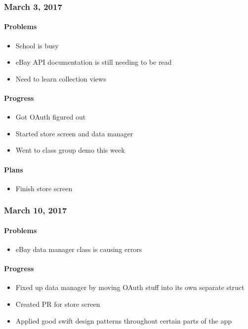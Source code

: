 \subsubsection{March 3, 2017}\label{section}
\paragraph{Problems}\label{problems}
\begin{itemize}
\tightlist
\item
  School is busy
\item
  eBay API documentation is still needing to be read
\item
  Need to learn collection views
\end{itemize}
\paragraph{Progress}\label{progress}
\begin{itemize}
\tightlist
\item
  Got OAuth figured out
\item
  Started store screen and data manager
\item
  Went to class group demo this week
\end{itemize}
\paragraph{Plans}\label{plans}
\begin{itemize}
\tightlist
\item
  Finish store screen
\end{itemize}

\subsubsection{March 10, 2017}\label{section}
\paragraph{Problems}\label{problems}
\begin{itemize}
\tightlist
\item
  eBay data manager class is causing errors
\end{itemize}
\paragraph{Progress}\label{progress}
\begin{itemize}
\tightlist
\item
  Fixed up data manager by moving OAuth stuff into its own separate
  struct
\item
  Created PR for store screen
\item
  Applied good swift design patterns throughout certain parts of the app
\end{itemize}
